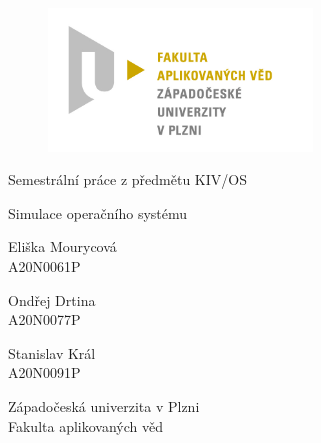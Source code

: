 \documentclass[12pt, a4paper]{article}
\begin{document}
	\renewcommand{\lstlistingname}{Ukázka kódu}
	\renewcommand{\lstlistlistingname}{Seznam ukázek kódu}
    \begin{titlepage}

        \centering

        \vspace*{\baselineskip}
        \begin{figure}[H]
        \centering
        \includegraphics[width=7cm]{img/fav-logo.jpg}
        \end{figure}

        \vspace*{1\baselineskip}

        \vspace{0.75\baselineskip}

        \vspace{0.5\baselineskip}
        {Semestrální práce z předmětu KIV/OS}

        {\LARGE\sc Simulace operačního systému\\}

        \vspace{4\baselineskip}

        \vspace{0.5\baselineskip}

        {\sc\Large Eliška Mourycová \\}
        \vspace{0.5\baselineskip}
        {A20N0061P}

        {\sc\Large Ondřej Drtina \\}
        \vspace{0.5\baselineskip}
        {A20N0077P}

        {\sc\Large Stanislav Král \\}
        \vspace{0.5\baselineskip}
        {A20N0091P}

        \vfill

        {\sc Západočeská univerzita v Plzni\\
        Fakulta aplikovaných věd}

    \end{titlepage}
\end{document}
